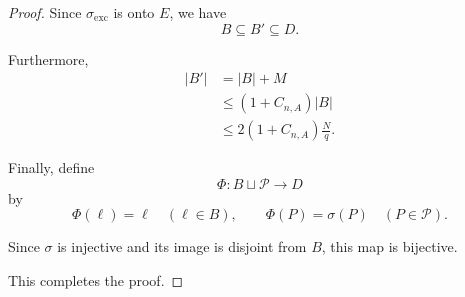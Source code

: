 \documentclass[11pt, letterpaper]{nyjm}
\begin{document}
\begin{proof}
		Since $\sigma_{\mathrm{exc}}$ is onto $E$,
		we have
		\[
		B\subseteq B'\subseteq D.
		\]
		
		Furthermore,
		\[
		\begin{aligned}
			|B'|
			&=|B|+M\\
			&\le(1+C_{n,A})|B|\\
			&\le2(1+C_{n,A})\frac Nq.
		\end{aligned}
		\]
		
		Finally, define
		\[
		\Phi:B\sqcup\mathcal P\longrightarrow D
		\]
		by
		\[
		\Phi(\ell)=\ell\quad(\ell\in B),
		\qquad
		\Phi(P)=\sigma(P)\quad(P\in\mathcal P).
		\]
		
		Since $\sigma$ is injective and its
		image is disjoint from $B$, this
		map is bijective.
		
		This completes the proof.
	\end{proof}
	
\end{document}
